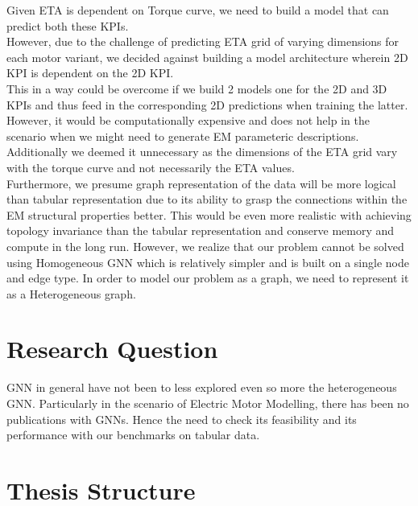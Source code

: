 \documentclass{report} %
\begin{document}
Given ETA is dependent on Torque curve, we need to build a model that can predict both these KPIs.\\
However, due to the challenge of predicting ETA grid of varying dimensions for each motor variant, we decided against building a model architecture wherein 2D KPI is dependent on the 2D KPI. \\
This in a way could be overcome if we build 2 models one for the 2D and 3D KPIs and thus feed in the corresponding 2D predictions when training the latter. \\
However, it would be computationally expensive and does not help in the scenario when we might need to generate \ac{EM} parameteric descriptions.
Additionally we deemed it unnecessary as the dimensions of the ETA grid vary with the torque curve and not necessarily the ETA values. \\

Furthermore, we presume graph representation of the data will be more logical than tabular representation due to its ability to grasp the connections within the \ac{EM} structural properties better.
This would be even more realistic with achieving topology invariance than the tabular representation and conserve memory and compute in the long run.
However, we realize that our problem cannot be solved using Homogeneous \ac{GNN} which is relatively simpler and is built on a single node and edge type.
In order to model our problem as a graph, we need to represent it as a Heterogeneous graph. \\

\section{Research Question}\label{sec:Research Question}
\ac{GNN} in general have not been to less explored even so more the heterogeneous \ac{GNN}.
Particularly in the scenario of Electric Motor Modelling, there has been no publications with \ac{GNN}s.
Hence the need to check its feasibility and its performance with our benchmarks on tabular data.


\section{Thesis Structure}\label{sec:Thesis Structure}
\end{document}
